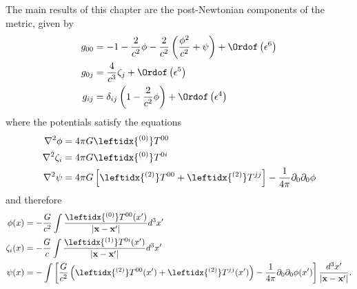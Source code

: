 The main results of this chapter are the post-Newtonian components of the metric, given by
\begin{subequations}\label{eq:PNMetricTensor}
\begin{align}
g_{00} &= -1 - \frac{2}{c^2} \phi - \frac{2}{c^2} \left(\frac{\phi^2}{c^2} + \psi \right) + \Ordof \left( \epsilon^6 \right) \\
g_{0j} &= \frac{4}{c^3} \zeta_j +  \Ordof \left( \epsilon^5 \right) \\
g_{ij} &= \delta_{ij} \left( 1 - \frac{2}{c^2} \phi \right) + \Ordof \left( \epsilon^4 \right)
\end{align}
\end{subequations}
where the potentials satisfy the equations
\begin{subequations}\label{eq:PoissonEquations}
\begin{align}
\nabla^2 \phi &= 4\pi G \leftidx{^{(0)}} T^{00} \\
\nabla^2 \zeta_i &= 4\pi G \leftidx{^{(0)}} T^{0i} \\
\nabla^2 \psi &= 4\pi G \left[ \leftidx{^{(2)}} T^{00} + \leftidx{^{(2)}} T^{jj} \right] - \frac{1}{4\pi} \partial_0 \partial_0 \phi 
\end{align}
\end{subequations}
and therefore
\begin{subequations}\label{eq:postNewtonianPotentials}
\begin{align}
\phi (x) &= - \frac{G}{c^2} \int \frac{\leftidx{^{(0)}}T^{00} (x')}{\left|  \textbf{x} - \textbf{x}' \right|} d^3 x' \\
\zeta_i (x) &= - \frac{G}{c} \int \frac{\leftidx{^{(1)}}T^{0i}(x')}{\left|  \textbf{x} - \textbf{x}' \right|} d^3 x' \\
\psi (x) &= -\int \left[ \frac{G}{c^2} \left( \leftidx{ ^{(2)}} T^{00} (x') + \leftidx{ ^{(2)}} T^{jj}(x') \right) - \frac{1}{4\pi} \partial_0 \partial_0 \phi (x') \right] \frac{d^3 x'}{\left| \textbf{x} - \textbf{x}'\right|}.
\end{align}
\end{subequations}

